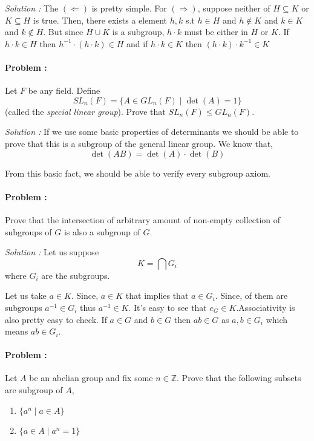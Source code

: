 \vspace{4mm}
\textit{Solution :}
The $(\Leftarrow)$ is pretty simple. For $(\Rightarrow)$, suppose neither of $H \subseteq K$ or 
$K \subseteq H$ is true. Then, there exists a element $h,k$  s.t $h \in H$ and $h \not \in K$ and $k \in K$ and $k \not \in H$.
But since $H \cup K$ is a subgroup, $h\cdot k$ must be either in $H$ or $K$. If $h \cdot k \in H$ then $h^{-1} \cdot (h \cdot k) \in H$
and if $h \cdot k \in K$ then $(h \cdot k) \cdot k^{-1} \in K$

\paragraph{Problem :} Let $F$ be any field. Define 
\[ SL_n(F) = \{ A \in GL_n(F) \mid \det(A)=1 \} \]
(called the \textit{special linear group}). Prove that $SL_n(F) \le GL_n(F)$.

\vspace{4mm}    
\textit{Solution :} If we use some basic properties of determinants we should be able to prove that this is a subgroup of the general linear group.
We know that,
\[ \det(A B) = \det(A) \cdot \det(B)\]

From this basic fact, we should be able to verify every subgroup axiom.

\paragraph{Problem :} Prove that the intersection of arbitrary amount of non-empty collection of subgroups of $G$ is also a subgroup of $G$.


\vspace{4mm}
\textit{Solution :} Let us suppose 
\[ K = \bigcap G_i \]
where $G_i$ are the subgroups. 

Let us take $a \in K$. Since, $a \in K$ that implies that $a \in G_i$. Since, of them are subgroups $a^{-1} \in G_i$ thus $a^{-1} \in K$.
It's easy to see that $e_G \in K$.Associativity is also pretty easy to check. If $a \in G$ and $b \in G$ then $ab \in G$ as $a, b\in G_i$ which means $ab \in G_i$.

\paragraph{Problem :} Let $A$ be an abelian group and fix some $n \in \mathbb{Z}$. Prove that the following subsets are subgroup of $A$,
\begin{enumerate}
    \item $\{a^n \mid a \in A\}$
    \item $\{a \in A \mid a^n =1 \}$
\end{enumerate}

